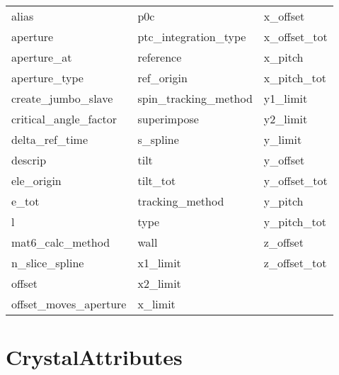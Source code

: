  \begin{tabular}{lll} \toprule
alias                       & p0c                         & x_offset                    \\
aperture                    & ptc_integration_type        & x_offset_tot                \\
aperture_at                 & reference                   & x_pitch                     \\
aperture_type               & ref_origin                  & x_pitch_tot                 \\
create_jumbo_slave          & spin_tracking_method        & y1_limit                    \\
critical_angle_factor       & superimpose                 & y2_limit                    \\
delta_ref_time              & s_spline                    & y_limit                     \\
descrip                     & tilt                        & y_offset                    \\
ele_origin                  & tilt_tot                    & y_offset_tot                \\
e_tot                       & tracking_method             & y_pitch                     \\
l                           & type                        & y_pitch_tot                 \\
mat6_calc_method            & wall                        & z_offset                    \\
n_slice_spline              & x1_limit                    & z_offset_tot                \\
offset                      & x2_limit                    &                             \\
offset_moves_aperture       & x_limit                     &                             \\
 \bottomrule
 \end{tabular}
 \vfill
 
 \section{CrystalAttributes}
 \label{s:list.crystal}
 
